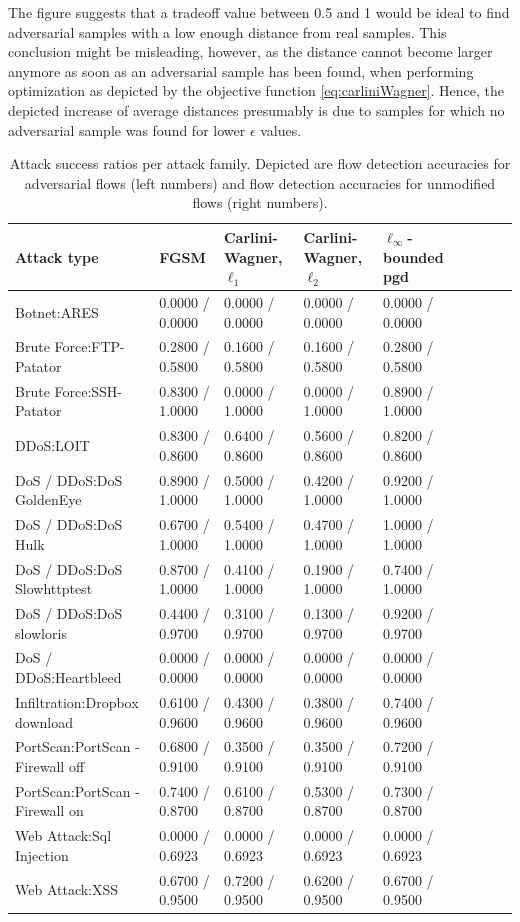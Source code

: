 \documentclass[conference]{IEEEtran}
\begin{document}
The figure suggests that a tradeoff value between 0.5 and 1 would be ideal to find adversarial samples with a low enough distance from real samples. This conclusion might be misleading, however, as the distance cannot become larger anymore as soon as an adversarial sample has been found, when performing optimization as depicted by the objective function \eqref{eq:carliniWagner}. Hence, the depicted increase of average distances presumably is due to samples for which no adversarial sample was found for lower $\epsilon$ values.


\begin{table}
\caption{Attack success ratios per attack family. Depicted are flow detection accuracies for adversarial flows (left numbers) and flow detection accuracies for unmodified flows (right numbers).}
\label{tab:adv_per_family}
\centering
\begin{tabular}{lllllllll}
\toprule
Attack type & FGSM & Carlini-Wagner, $\ell_1$ & Carlini-Wagner, $\ell_2$ & $\ell_\infty$-bounded \gls{pgd} \\
\midrule
Botnet:ARES	&	0.0000 / 0.0000	&	0.0000 / 0.0000	&	0.0000 / 0.0000	&	0.0000 / 0.0000	\\
Brute Force:FTP-Patator	&	0.2800 / 0.5800	&	0.1600 / 0.5800	&	0.1600 / 0.5800	&	0.2800 / 0.5800	\\
Brute Force:SSH-Patator	&	0.8300 / 1.0000	&	0.0000 / 1.0000	&	0.0000 / 1.0000	&	0.8900 / 1.0000	\\
DDoS:LOIT	&	0.8300 / 0.8600	&	0.6400 / 0.8600	&	0.5600 / 0.8600	&	0.8200 / 0.8600	\\
DoS / DDoS:DoS GoldenEye	&	0.8900 / 1.0000	&	0.5000 / 1.0000	&	0.4200 / 1.0000	&	0.9200 / 1.0000	\\
DoS / DDoS:DoS Hulk	&	0.6700 / 1.0000	&	0.5400 / 1.0000	&	0.4700 / 1.0000	&	1.0000 / 1.0000	\\
DoS / DDoS:DoS Slowhttptest	&	0.8700 / 1.0000	&	0.4100 / 1.0000	&	0.1900 / 1.0000	&	0.7400 / 1.0000	\\
DoS / DDoS:DoS slowloris	&	0.4400 / 0.9700	&	0.3100 / 0.9700	&	0.1300 / 0.9700	&	0.9200 / 0.9700	\\
DoS / DDoS:Heartbleed	&	0.0000 / 0.0000	&	0.0000 / 0.0000	&	0.0000 / 0.0000	&	0.0000 / 0.0000	\\
Infiltration:Dropbox download 	&	0.6100 / 0.9600	&	0.4300 / 0.9600	&	0.3800 / 0.9600	&	0.7400 / 0.9600	\\
PortScan:PortScan - Firewall off	&	0.6800 / 0.9100	&	0.3500 / 0.9100	&	0.3500 / 0.9100	&	0.7200 / 0.9100	\\
PortScan:PortScan - Firewall on	&	0.7400 / 0.8700	&	0.6100 / 0.8700	&	0.5300 / 0.8700	&	0.7300 / 0.8700	\\
Web Attack:Sql Injection	&	0.0000 / 0.6923	&	0.0000 / 0.6923	&	0.0000 / 0.6923	&	0.0000 / 0.6923	\\
Web Attack:XSS	&	0.6700 / 0.9500	&	0.7200 / 0.9500	&	0.6200 / 0.9500	&	0.6700 / 0.9500	\\
\bottomrule


\end{tabular}
\end{table}
\end{document}
